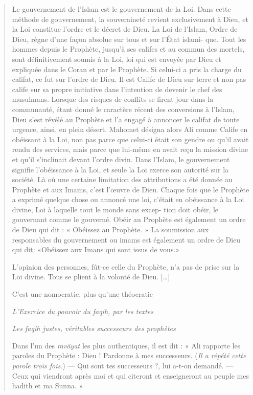 \begin{quote}
Le gouvernement de l'Islam est le gouvernement de la Loi. Dans cette
méthode de gouvernement, la souveraineté revient exclusivement à Dieu,
et la Loi constitue l'ordre et le décret de Dieu. La Loi de l'Islam,
Ordre de Dieu, règne d'une façon absolue sur tous et sur l'État islami-
que. Tout les hommes depuis le Prophète, jusqu'à ses califes et au
commun des mortels, sont définitivement soumis à la Loi, loi qui est
envoyée par Dieu et expliquée dans le Coran et par le Prophète. Si
celui-ci a pris la charge du califat, ce fut sur l'ordre de Dieu. Il est
Calife de Dieu sur terre et non pas calife sur sa propre initiative dans
l'intention de devenir le chef des musulmans. Lorsque des risques de
conflits se firent jour dans la communauté, étant donné le caractère
récent des conversions à l'Islam, Dieu s'est révélé au Prophète et l'a
engagé à annoncer le califat de toute urgence, ainsi, en plein désert.
Mahomet désigna alors Ali comme Calife en obéissant à la Loi, non pas
parce que celui-ci était son gendre ou qu'il avait rendu des services,
mais parce que lui-même en avait reçu la mission divine et qu'il
s'inclinait devant l'ordre divin. Dans l'Islam, le gouvernement signifie
l'obéissance à la Loi, et seule la Loi exerce son autorité sur la
société. Là où une certaine limitation des attributions a été donnée au
Prophète et aux Imams, c'est l'œuvre de Dieu. Chaque fois que le
Prophète a exprimé quelque chose ou annoncé une loi, c'était en
obéissance à la Loi divine, Loi à laquelle tout le monde sans excep-
tion doit obéir, le gouvernant comme le gouverné. Obéir au Prophète est
également un ordre de Dieu qui dit : « Obéissez au Prophète. » La
soumission aux responsables du gouvernement ou imams est également un
ordre de Dieu qui dit: «Obéissez aux Imans qui sont issus de vous.»

L'opinion des personnes, fût-ce celle du Prophète, n'a pas de prise sur
la Loi divine. Tous se plient à la volonté de Dieu. {[}\ldots{]}


\begin{Synthesis}
C'est une nomocratie, plus qu'une théocratie
\end{Synthesis}

\emph{L'Exercice du pouvoir du faqih, par les textes}

\emph{Les faqih justes, véritables successeurs des prophètes}

Dans l'un des \emph{ravâyat} les plus authentiques, il est dit : « Ali
rapporte les paroles du Prophète : Dieu ! Pardonne à mes successeurs.
(\emph{Il a répété cette parole trois fois}.) --- Qui sont tes
successeurs ?, lui a-t-on demandé. --- Ceux qui viendront après moi et
qui citeront et enseigneront au peuple mes hadith et ma Sunna. »


\end{quote}
